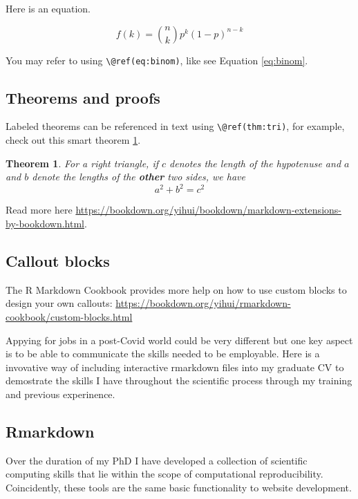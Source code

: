 \documentclass[
]{article}
\newtheorem{theorem}{Theorem}[section]
\theoremstyle{definition}
\theoremstyle{definition}
\theoremstyle{definition}
\theoremstyle{definition}
\theoremstyle{remark}
\begin{document}
Here is an equation.

\begin{equation} 
  f\left(k\right) = \binom{n}{k} p^k\left(1-p\right)^{n-k}
  \label{eq:binom}
\end{equation}

You may refer to using \texttt{\textbackslash{}@ref(eq:binom)}, like see Equation \eqref{eq:binom}.

\hypertarget{theorems-and-proofs}{%
\subsection{Theorems and proofs}\label{theorems-and-proofs}}

Labeled theorems can be referenced in text using \texttt{\textbackslash{}@ref(thm:tri)}, for example, check out this smart theorem \ref{thm:tri}.

\begin{theorem}
\protect\hypertarget{thm:tri}{}\label{thm:tri}For a right triangle, if \(c\) denotes the \emph{length} of the hypotenuse
and \(a\) and \(b\) denote the lengths of the \textbf{other} two sides, we have
\[a^2 + b^2 = c^2\]
\end{theorem}

Read more here \url{https://bookdown.org/yihui/bookdown/markdown-extensions-by-bookdown.html}.

\hypertarget{callout-blocks}{%
\subsection{Callout blocks}\label{callout-blocks}}

The R Markdown Cookbook provides more help on how to use custom blocks to design your own callouts: \url{https://bookdown.org/yihui/rmarkdown-cookbook/custom-blocks.html}

Appying for jobs in a post-Covid world could be very different but one key aspect is to be able to communicate the skills needed to be employable. Here is a invovative way of including interactive rmarkdown files into my graduate CV to demostrate the skills I have throughout the scientific process through my training and previous experinence.

\hypertarget{rmarkdown}{%
\subsection{Rmarkdown}\label{rmarkdown}}

Over the duration of my PhD I have developed a collection of scientific computing skills that lie within the scope of computational reproducibility. Coincidently, these tools are the same basic functionality to website development.
\end{document}
